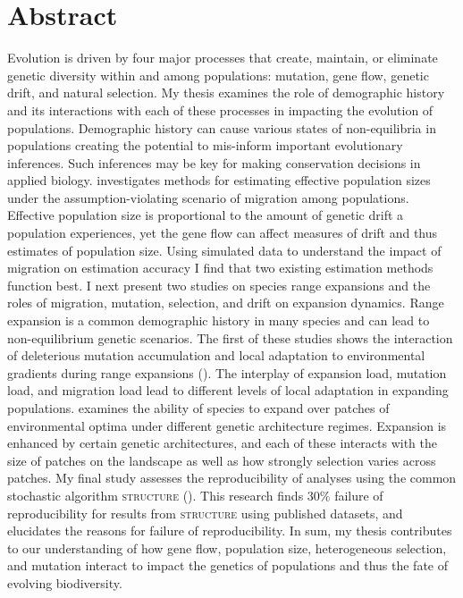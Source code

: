 \chapter*{Abstract}

Evolution is driven by four major processes that create, maintain, or eliminate genetic diversity within and among populations: mutation, gene flow, genetic drift, and natural selection. My thesis examines the role of demographic history and its interactions with each of these processes in impacting the evolution of populations. Demographic history can cause various states of non-equilibria in populations creating the potential to mis-inform important evolutionary inferences. Such inferences may be key for making conservation decisions in applied biology.  investigates methods for estimating effective population sizes under the assumption-violating scenario of migration among populations. Effective population size is proportional to the amount of genetic drift a population experiences, yet the gene flow can affect measures of drift and thus estimates of population size. Using simulated data to understand the impact of migration on estimation accuracy I find that two existing estimation methods function best. I next present two studies on species range expansions and the roles of migration, mutation, selection, and drift on expansion dynamics. Range expansion is a common demographic history in many species and can lead to non-equilibrium genetic scenarios. The first of these studies shows the interaction of deleterious mutation accumulation and local adaptation to environmental gradients during range expansions (). The interplay of expansion load, mutation load, and migration load lead to different levels of local adaptation in expanding populations.  examines the ability of species to expand over patches of environmental optima under different genetic architecture regimes. Expansion is enhanced by certain genetic architectures, and each of these interacts with the size of patches on the landscape as well as how strongly selection varies across patches. My final study assesses the reproducibility of analyses using the common stochastic algorithm \textsc{structure} (). This research finds $30\%$ failure of reproducibility for results from \textsc{structure} using published datasets, and elucidates the reasons for failure of reproducibility. In sum, my thesis contributes to our understanding of how gene flow, population size, heterogeneous selection, and mutation interact to impact the genetics of populations and thus the fate of evolving biodiversity.

